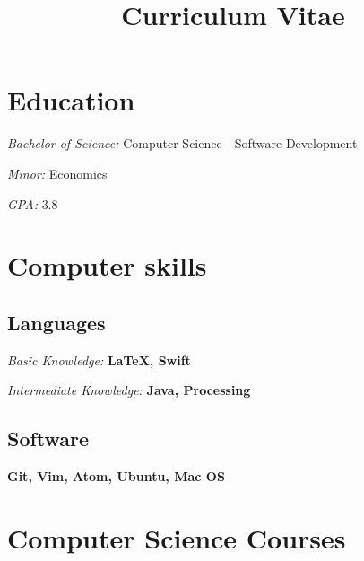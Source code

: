 \documentclass[11pt,a4paper,sans]{moderncv} %
\title{Curriculum Vitae}
\begin{document}
\makecvtitle %

\section{Education}

{\textit{Bachelor of Science: }{Computer Science - Software Development}}

{\textit{Minor: }{Economics}

{\textit{GPA: }{3.8}

\section{Computer skills}

\subsection{Languages}
{\textit{Basic Knowledge: }{\textbf{LaTeX, Swift}}}

{\textit{Intermediate Knowledge: }{\textbf{Java, Processing}}}

\subsection{Software}
{\textbf{Git, Vim, Atom, Ubuntu, Mac OS}}

\section{Computer Science Courses}

}}
\end{document}
